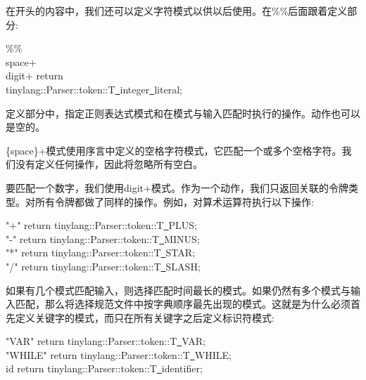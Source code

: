 在开头的内容中，我们还可以定义字符模式以供以后使用。在\%\%后面跟着定义部分:\par

\begin{tcolorbox}[colback=white,colframe=black]
\%\% \\
{space}+ \\
{digit}+ \hspace{1 cm}return \\
\hspace*{3 cm}tinylang::Parser::token::T\underline{~}integer\underline{~}literal;
\end{tcolorbox}

定义部分中，指定正则表达式模式和在模式与输入匹配时执行的操作。动作也可以是空的。\par

\{space\}+模式使用序言中定义的空格字符模式，它匹配一个或多个空格字符。我们没有定义任何操作，因此将忽略所有空白。\par

要匹配一个数字，我们使用{digit}+模式。作为一个动作，我们只返回关联的令牌类型。对所有令牌都做了同样的操作。例如，对算术运算符执行以下操作:\par

\begin{tcolorbox}[colback=white,colframe=black]
"+" \hspace{2cm}return tinylang::Parser::token::T\underline{~}PLUS; \\
"-" \hspace{2cm}return tinylang::Parser::token::T\underline{~}MINUS; \\
"*" \hspace{2cm}return tinylang::Parser::token::T\underline{~}STAR; \\
"/" \hspace{2cm}return tinylang::Parser::token::T\underline{~}SLASH;	
\end{tcolorbox}

如果有几个模式匹配输入，则选择匹配时间最长的模式。如果仍然有多个模式与输入匹配，那么将选择规范文件中按字典顺序最先出现的模式。这就是为什么必须首先定义关键字的模式，而只在所有关键字之后定义标识符模式:\par

\begin{tcolorbox}[colback=white,colframe=black]
"VAR" \hspace{2cm}return tinylang::Parser::token::T\underline{~}VAR; \\
"WHILE" \hspace{2cm}return tinylang::Parser::token::T\underline{~}WHILE; \\
{id} \hspace{2cm}return tinylang::Parser::token::T\underline{~}identifier;	
\end{tcolorbox}


